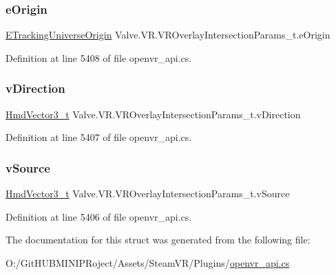 \subsubsection{\texorpdfstring{eOrigin}{eOrigin}}
{\footnotesize\ttfamily \mbox{\hyperlink{namespace_valve_1_1_v_r_a29be99a3c2f780157bd490db06a7f12f}{E\+Tracking\+Universe\+Origin}} Valve.\+V\+R.\+V\+R\+Overlay\+Intersection\+Params\+\_\+t.\+e\+Origin}



Definition at line 5408 of file openvr\+\_\+api.\+cs.

\mbox{\label{struct_valve_1_1_v_r_1_1_v_r_overlay_intersection_params__t_a7ef143cb30ca995af07a4956a91091e9}} 
\subsubsection{\texorpdfstring{vDirection}{vDirection}}
{\footnotesize\ttfamily \mbox{\hyperlink{struct_valve_1_1_v_r_1_1_hmd_vector3__t}{Hmd\+Vector3\+\_\+t}} Valve.\+V\+R.\+V\+R\+Overlay\+Intersection\+Params\+\_\+t.\+v\+Direction}



Definition at line 5407 of file openvr\+\_\+api.\+cs.

\mbox{\label{struct_valve_1_1_v_r_1_1_v_r_overlay_intersection_params__t_ad2605f2aebb1ea1943cd88c73ce652d1}} 
\subsubsection{\texorpdfstring{vSource}{vSource}}
{\footnotesize\ttfamily \mbox{\hyperlink{struct_valve_1_1_v_r_1_1_hmd_vector3__t}{Hmd\+Vector3\+\_\+t}} Valve.\+V\+R.\+V\+R\+Overlay\+Intersection\+Params\+\_\+t.\+v\+Source}



Definition at line 5406 of file openvr\+\_\+api.\+cs.



The documentation for this struct was generated from the following file\+:\begin{DoxyCompactItemize}
\item 
O\+:/\+Git\+H\+U\+B\+M\+I\+N\+I\+P\+Roject/\+Assets/\+Steam\+V\+R/\+Plugins/\mbox{\hyperlink{openvr__api_8cs}{openvr\+\_\+api.\+cs}}\end{DoxyCompactItemize}

